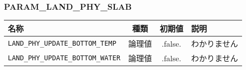 \subsubsection{PARAM\_LAND\_PHY\_SLAB}
\begin{tabularx}{150mm}{|l|c|c|X|} \hline
 \rowcolor[gray]{0.9} 名称 & 種類 & 初期値 & 説明 \\ \hline
 \verb|LAND_PHY_UPDATE_BOTTOM_TEMP| & 論理値 & .false. & わかりません \\ \hline
 \verb|LAND_PHY_UPDATE_BOTTOM_WATER| & 論理値 & .false. & わかりません \\ \hline
\end{tabularx}



